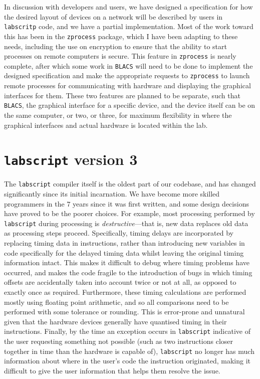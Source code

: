 In discussion with developers and users, we have designed a specification for how the desired layout of devices on a network will be described by users in \texttt{labscritp} code, and we have a partial implementation. Most of the work toward this has been in the \texttt{zprocess} package, which I have been adapting to these needs, including the use on encryption to ensure that the ability to start processes on remote computers is secure. This feature in \texttt{zprocess} is nearly complete, after which some work in \texttt{BLACS} will need to be done to implement the designed specification and make the appropriate requests to \texttt{zprocess} to launch remote processes for communicating with hardware and displaying the graphical interfaces for them. These two features are planned to be separate, such that \texttt{BLACS}, the graphical interface for a specific device, and the device itself can be on the same computer, or two, or three, for maximum flexibility in where the graphical interfaces and actual hardware is located within the lab.

\section{\texttt{labscript} version 3}

The \texttt{labscript} compiler itself is the oldest part of our codebase, and has changed significantly since its initial incarnation. We have become more skilled programmers in the $7$ years since it was first written, and some design decisions have proved to be the poorer choices. For example, most processing performed by \texttt{labscript} during processing is \emph{destructive}---that is, new data replaces old data as processing steps proceed. Specifically, timing delays are incorporated by replacing timing data in instructions, rather than introducing new variables in code specifically for the delayed timing data whilst leaving the original timing information intact. This makes it difficult to debug where timing problems have occurred, and makes the code fragile to the introduction of bugs in which timing offsets are accidentally taken into account twice or not at all, as opposed to exactly once as required. Furthermore, these timing calculations are performed mostly using floating point arithmetic, and so all comparisons need to be performed with some tolerance or rounding. This is error-prone and unnatural given that the hardware devices generally have quantised timing in their instructions. Finally, by the time an exception occurs in \texttt{labscript} indicative of the user requesting something not possible (such as two instructions closer together in time than the hardware is capable of), \texttt{labscript} no longer has much information about where in the user's code the instruction originated, making it difficult to give the user information that helps them resolve the issue.

